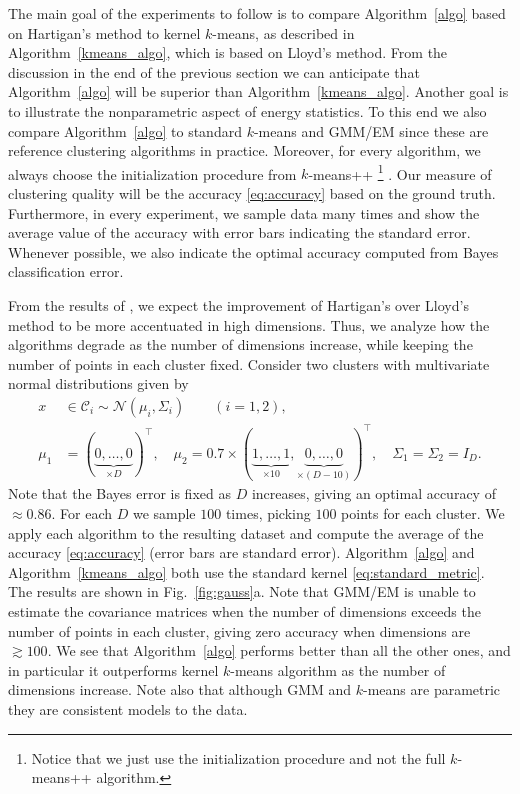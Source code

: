 \documentclass[aps,preprint,nofootinbib,floatfix]{revtex4-1}
\newcommand\C{{\mathcal{C}}}
\begin{document}
The main goal of the 
experiments  to follow
is to compare Algorithm~\ref{algo} based on Hartigan's method to
kernel $k$-means, as described in Algorithm~\ref{kmeans_algo}, which
is based on Lloyd's method. 
From the discussion in the end of the previous section we can anticipate
that Algorithm~\ref{algo} will be superior than Algorithm~\ref{kmeans_algo}.
Another goal is to illustrate the nonparametric aspect of energy statistics.
To this end we also compare
Algorithm~\ref{algo} to standard $k$-means and GMM/EM since 
these are reference
clustering algorithms in practice.
Moreover, for every algorithm, we always
choose the initialization procedure from $k$-means++%
\footnote{Notice that we just use the initialization
procedure and not the full $k$-means++ algorithm.} \cite{Vassilvitskii}.
Our measure of clustering quality will be the accuracy \eqref{eq:accuracy}
based on the ground truth. Furthermore, in every experiment, we sample
data many times and show the average value of the accuracy with error bars
indicating the standard error. Whenever possible, 
we also indicate the optimal 
accuracy computed from
Bayes classification error.

From the results of \cite{Telgarsky}, we expect the improvement of Hartigan's 
over Lloyd's method to be more accentuated in high dimensions.
Thus, we analyze
how the algorithms degrade as the number of dimensions increase, while
keeping the number of points in each cluster fixed. Consider
two clusters with multivariate normal distributions given by
\begin{equation}
\label{eq:gauss1}
\begin{split}
x &\in \C_i  \sim 
\mathcal{N}(\mu_i,\Sigma_i) \qquad (i=1,2),  \\
\mu_1 &= (\underbrace{0,\dotsc,0}_{\times D})^\top , \quad
\mu_2 = 0.7 \times (\underbrace{1,\dots,1}_{\times 10},
\underbrace{0,\dots,0}_{\times (D-10)})^\top, \quad
\Sigma_1 = \Sigma_2 = I_D.
\end{split}
\end{equation}
Note that the Bayes error
is fixed as $D$ increases, giving an optimal 
accuracy of $\approx 0.86$.
For each $D$ we sample $100$ times, picking $100$ points for each cluster.
We apply each algorithm to the resulting dataset 
and compute the average of the accuracy \eqref{eq:accuracy} (error bars
are standard error).
Algorithm~\ref{algo} and Algorithm~\ref{kmeans_algo} 
both use the standard
kernel \eqref{eq:standard_metric}.
The results are shown in Fig.~\ref{fig:gauss}a.
Note that GMM/EM is unable to estimate the covariance matrices
when the number of dimensions exceeds the number of points in each cluster,
giving zero accuracy when dimensions are $\gtrsim 100$.
We see that Algorithm~\ref{algo} performs better than all the other ones,
and in particular it outperforms kernel $k$-means algorithm as the number
of dimensions increase. Note also that although GMM and $k$-means are
parametric they are consistent models to the data.
\end{document}
